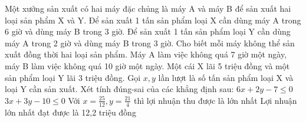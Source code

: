 \begin{ex}
 Một xưởng sản xuất có hai máy đặc chủng là máy A và máy B để sản xuất hai loại sản phẩm X và Y. Để sản xuất 1 tấn sản phẩm loại X cần dùng máy A trong 6 giờ và dùng máy B trong 3 giờ. Để sản xuất 1 tấn sản phẩm loại Y cần dùng máy A trong 2 giờ và dùng máy B trong 3 giờ. Cho biết mỗi máy không thể sản xuất đồng thời hai loại sản phẩm. Máy A làm việc không quá 7 giờ một ngày, máy B làm việc không quá 10 giờ một ngày. Một cái X lãi 5 triệu đồng và một sản phẩm loại Y lãi 3 triệu đồng. Gọi ${x,y}$ lần lượt là số tấn sản phẩm loại X và loại Y cần sản xuất. Xét tính đúng-sai của các khẳng định sau:
\choiceTFt
{ \True  $6 x + 2 y - 7 \le 0$ }
   { \True  $3 x + 3 y - 10 \le 0$ }
     { Với $x = \frac{25}{12}, y = \frac{21}{4}$ thì lợi nhuận thu được là lớn nhất }
    { Lợi nhuận lớn nhất đạt được là 12,2 triệu đồng  }
\end{ex}

